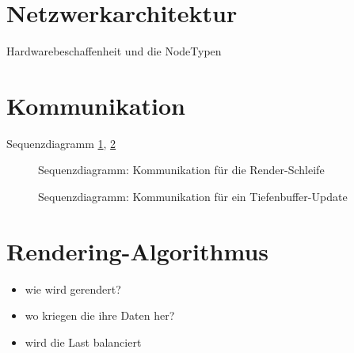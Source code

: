 \section{Netzwerkarchitektur}
\label{sec:impl:netzwerkarchitektur}
%
Hardwarebeschaffenheit und die NodeTypen

\section{Kommunikation}
\label{sec:impl:kommunikation}
%
Sequenzdiagramm \ref{fig:impl:seqdiagrender}, \ref{fig:impl:seqdiagdepth}

\begin{figure}

  \caption{Sequenzdiagramm: Kommunikation für die Render-Schleife}
  \label{fig:impl:seqdiagrender}
\end{figure}

\begin{figure}

  \caption{Sequenzdiagramm: Kommunikation für ein Tiefenbuffer-Update}
  \label{fig:impl:seqdiagdepth}
\end{figure}

\section{Rendering-Algorithmus}
\label{sec:impl:renderalgo}
%
\begin{itemize}
 \item wie wird gerendert?
 \item wo kriegen die ihre Daten her?
 \item wird die Last balanciert
\end{itemize}


%
%
